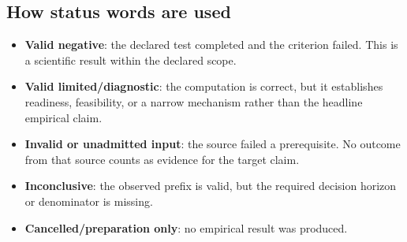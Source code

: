 \documentclass[10pt,a4paper]{article}
\begin{document}
\subsection{How status words are used}
\begin{itemize}
\item \textbf{Valid negative}: the declared test completed and the criterion failed. This is a scientific result within the declared scope.
\item \textbf{Valid limited/diagnostic}: the computation is correct, but it establishes readiness, feasibility, or a narrow mechanism rather than the headline empirical claim.
\item \textbf{Invalid or unadmitted input}: the source failed a prerequisite. No outcome from that source counts as evidence for the target claim.
\item \textbf{Inconclusive}: the observed prefix is valid, but the required decision horizon or denominator is missing.
\item \textbf{Cancelled/preparation only}: no empirical result was produced.
\end{itemize}
\clearpage
\end{document}
